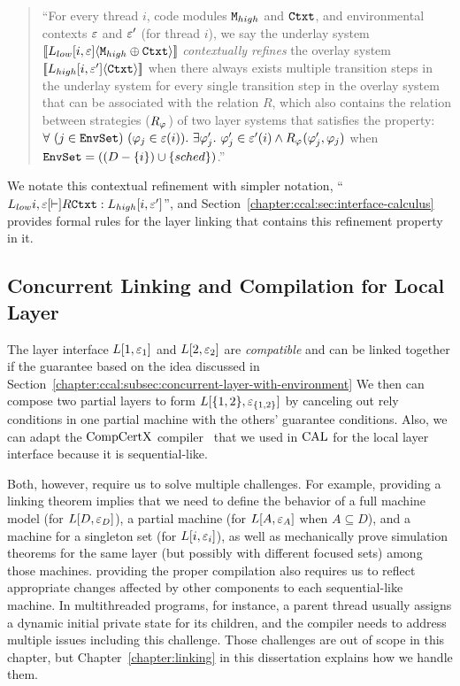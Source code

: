 \begin{quote}
``For every thread $i$,  code modules ${\mathrm{\texttt{M}}}_{high}$ and  ${\mathrm{\texttt{Ctxt}}}$,  and environmental contexts
  ${\varepsilon}$ and ${\varepsilon}'$ (for thread $i$), we say the underlay system   $[\![{L_{low}[i, {\varepsilon}]} \langle {{\mathrm{\texttt{M}}}_{high} \oplus {\mathrm{\texttt{Ctxt}}}} \rangle]\!]$
     \textit{contextually
 refines} the overlay system $ [\![{L_{high}[i, {\varepsilon}']} \langle {{\mathrm{\texttt{Ctxt}}}} \rangle]\!]$ when there always exists 
 multiple  transition steps in the underlay system for every  single  transition step
  in the overlay system that can be associated with the relation $R$,
which also contains the relation between strategies ($R_{\varphi_{}}$)
 of two layer systems that satisfies the property:
$\forall\ (j \in \codeinmath{EnvSet})\ 
(\strat{j} \in \oracle(i)) .\ \exists \stratp{j} . \ \stratp{j} \in \oracle'(i) \wedge R_{\strat{}}(\stratp{j}, \strat{j})$ when 
${\mathrm{\texttt{EnvSet}}} = ((D - \{ i\}) \cup \{ sched\})$.''
\end{quote}

{\noindent}We notate this contextual refinement with simpler notation, 
``$L_{low}{i, {\varepsilon}}{}[\vdash]{R} {\texttt{Ctxt}} : L_{high}[i, {\varepsilon}']$'', and
Section~\ref{chapter:ccal:sec:interface-calculus} provides formal rules for the layer linking that contains this refinement property in it.

\subsection{Concurrent Linking and Compilation for Local Layer}
\label{chapter:ccal:subsec:concurrent-linking-and compilation-for-local-layer}

The layer interface $L[1, {\varepsilon}_1]$ and $L[2, {\varepsilon}_2]$ are  {\em compatible} and can be linked together if the guarantee based on
the idea discussed in Section~\ref{chapter:ccal:subsec:concurrent-layer-with-environment}
We then can compose two partial layers to form 
$L[\{1, 2\}, {\varepsilon}_{\{1, 2\}}]$ by canceling out rely conditions in one partial machine with the others' guarantee conditions.
Also, we can adapt the $\mathrm{CompCertX}$ compiler~\cite{deepspec} that we used in $\mathrm{CAL}$
for the local layer interface because it is sequential-like.

Both, however, require us to solve multiple challenges. 
For example, providing a linking theorem  
implies that we need to define the behavior of a full machine model (for $L[D, {\varepsilon}_{D}]$), a partial machine (for $L[A, {\varepsilon}_{A}]$ when $A \subseteq D$), and 
a machine for a singleton set (for $L[i, {\varepsilon}_{i}]$), as well as mechanically prove simulation theorems for the same layer (but possibly with different focused sets) among those machines. 
providing the proper compilation also requires 
us to reflect appropriate changes affected by other components to each sequential-like machine.
In multithreaded programs, for instance, a parent thread usually assigns a dynamic initial private state for its children,
and the compiler needs to address multiple issues including this challenge. 
Those challenges are out of scope in this chapter, but Chapter~\ref{chapter:linking} in this dissertation explains how we handle them.
